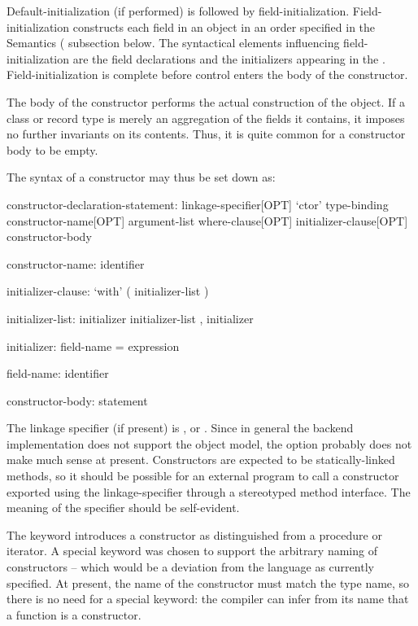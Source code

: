 Default-initialization (if performed) is followed by field-initialization.  Field-initialization
constructs each field in an object in an order specified in the Semantics
( subsection below.  The syntactical elements influencing
field-initialization are the field declarations and the initializers appearing in the
.  Field-initialization is complete before control enters the body
of the constructor.

The body of the constructor performs the actual construction of the object.  If a class or
record type is merely an aggregation of the fields it contains, it imposes no further
invariants on its contents.
Thus, it is quite common for a constructor body to be empty.

The syntax of a constructor may thus be set down as:
\begin{syntax}
constructor-declaration-statement:
  linkage-specifier[OPT] `ctor' type-binding constructor-name[OPT] argument-list 
    where-clause[OPT] initializer-clause[OPT] constructor-body

constructor-name:
  identifier

initializer-clause:
  `with' ( initializer-list )

initializer-list:
  initializer
  initializer-list , initializer

initializer:
  field-name = expression

field-name:
  identifier

constructor-body:
  statement
\end{syntax}

The linkage specifier (if present) is ,  or .  Since
in general the backend implementation does not support the object model, the
 option probably does not make much sense at present.  Constructors are
expected to be statically-linked methods, so it should be possible for an external program
to call a constructor exported using the
 linkage-specifier through a stereotyped method interface.  The meaning of
the  specifier should be self-evident.

The keyword  introduces a constructor as distinguished from a procedure or
iterator.  A special keyword was chosen to support the arbitrary naming of constructors --
which would be a deviation from the language as currently specified.  At present, the name
of the constructor must match the type name, so there is no need for a special keyword:
the compiler can infer from its name that a function is a constructor.

